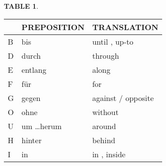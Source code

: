 \documentclass[a4paper,twocolumn,10pt]{article}
\newtheorem{mytable}{TABLE}[section]
\begin{document}

\nolinenumbers

\begin{table-bg}[width=\linewidth]{}



	\begin{table-title}[width=6.5cm]{}
		\captionsetup{labelformat=empty}
	\end{table-title}

	\begin{table-theword}
		\footnotesize \begin{mytable}\label{table:prepositions_accusative} \end{mytable}
	\end{table-theword}

	\begin{table-content}
	\begin{tabularx}{\textwidth}{l|XX}

		& PREPOSITION & TRANSLATION \\

		\midrule

		\cellcolor{gray-light} B&
		\cellcolor{white} bis &
		\cellcolor{white} until , up-to \\

		\cellcolor{gray-light} D&
		\cellcolor{white} durch &
		\cellcolor{white} through \\


		\cellcolor{gray-light} E&
		\cellcolor{white} entlang &
		\cellcolor{white} along \\


		\cellcolor{gray-light} F&
		\cellcolor{white} für &
		\cellcolor{white} for \\


		\cellcolor{gray-light} G&
		\cellcolor{white} gegen &
		\cellcolor{white} against / opposite \\


		\cellcolor{gray-light} O&
		\cellcolor{white} ohne &
		\cellcolor{white}  without\\


		\cellcolor{gray-light} U&
		\cellcolor{white} um \ldots herum &
		\cellcolor{white}  around\\


		\cellcolor{gray-light} H&
		\cellcolor{white} hinter &
		\cellcolor{white}  behind\\


		\cellcolor{gray-light} I&
		\cellcolor{white} in &
		\cellcolor{white} in , inside \\



\end{tabularx}
\end{table-content}
\end{table-bg}
\end{document}
